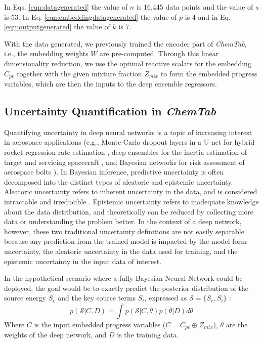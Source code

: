 \documentclass[conf]{new-aiaa}
\begin{document}
In Eqs. \ref{eqn:datagenerated} the value of $n$ is 16,445 data points and the value of $s$ is 53. In Eq. \ref{eqn:embeddingdatagenerated} the value of $p$ is 4 and in Eq. \ref{eqn:outputgenerated} the value of $k$ is 7.

With the data generated, we previously trained the encoder part of \textit{ChemTab}, i.e., the embedding weights $W$ are pre-computed. Through this linear dimensionality reduction, we use the optimal reactive scalars for the embedding $C_{pv}$ together with the given mixture fraction $Z_{mix}$ to form the embedded progress variables, which are then the inputs to the deep ensemble regressors.


\subsection{Uncertainty Quantification in \textit{ChemTab}}

Quantifying uncertainty in deep neural networks is a topic of increasing interest in aerospace applications (e.g., Monte-Carlo dropout layers in a U-net for hybrid rocket regression rate estimation \cite{SURINA2022160}, deep ensembles for the inertia estimation of target and servicing spacecraft \cite{CHU2020106189}, and Bayesian networks for risk assessment of aerospace bolts \cite{aerospacebolts}). In Bayesian inference, predictive uncertainty is often decomposed into the distinct types of aleatoric and epistemic uncertainty. Aleatoric uncertainty refers to inherent uncertainty in the data, and is considered intractable and irreducible \cite{ABDAR2021243}.
Epistemic uncertainty refers to inadequate knowledge about the data distribution, and theoretically can be reduced by collecting more data or understanding the problem better. In the context of a deep network, however, these two traditional uncertainty definitions are not easily separable because any prediction from the trained model is impacted by the model form uncertainty, the aleatoric uncertainty in the data used for training, and the epistemic uncertainty in the input data of interest. 

In the hypothetical scenario where a fully Bayesian Neural Network could be deployed, the goal would be to exactly predict the posterior distribution of the source energy $S_e$ and the key source terms $\dot{S}_i$, expressed as $\mathcal{S}= \{S_e, \dot{S}_i \} $ :
\begin{equation}
\label{sample:posterior}
p(\mathcal{S}|C, D) = \int p(\mathcal{S}|C, \theta) p(\theta|D)d\theta
\end{equation}
Where $C$ is the input embedded progress variables ($C = C_{pv} \oplus Z_{mix} $), $\theta$ are the weights of the deep network, and $D$ is the training data. 
\end{document}
